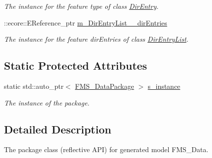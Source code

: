\begin{DoxyCompactItemize}
\begin{DoxyCompactList}\small\item\em The instance for the feature type of class \hyperlink{classFMS__Data_1_1DirEntry}{DirEntry}. \item\end{DoxyCompactList}\item 
\hypertarget{classFMS__Data_1_1FMS__DataPackage_a042eb8fc0dafa3dae4df6b20f792467d}{
::ecore::EReference\_\-ptr \hyperlink{classFMS__Data_1_1FMS__DataPackage_a042eb8fc0dafa3dae4df6b20f792467d}{m\_\-DirEntryList\_\-\_\-dirEntries}}
\label{classFMS__Data_1_1FMS__DataPackage_a042eb8fc0dafa3dae4df6b20f792467d}

\begin{DoxyCompactList}\small\item\em The instance for the feature dirEntries of class \hyperlink{classFMS__Data_1_1DirEntryList}{DirEntryList}. \item\end{DoxyCompactList}\end{DoxyCompactItemize}
\subsection*{Static Protected Attributes}
\begin{DoxyCompactItemize}
\item 
\hypertarget{classFMS__Data_1_1FMS__DataPackage_abc838af212a2ce9101d50c6adc159658}{
static std::auto\_\-ptr$<$ \hyperlink{classFMS__Data_1_1FMS__DataPackage}{FMS\_\-DataPackage} $>$ \hyperlink{classFMS__Data_1_1FMS__DataPackage_abc838af212a2ce9101d50c6adc159658}{s\_\-instance}}
\label{classFMS__Data_1_1FMS__DataPackage_abc838af212a2ce9101d50c6adc159658}

\begin{DoxyCompactList}\small\item\em The instance of the package. \item\end{DoxyCompactList}\end{DoxyCompactItemize}


\subsection{Detailed Description}
The package class (reflective API) for generated model FMS\_\-Data. 

